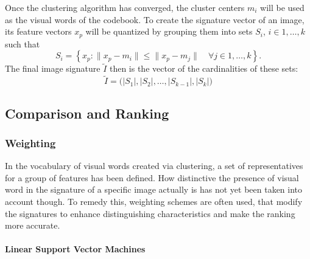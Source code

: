 Once the clustering algorithm has converged, the cluster centers $m_i$ will be
used as the visual words of the codebook. To create the signature vector of an
image, its feature vectors $x_p$ will be quantized by grouping them into sets
$S_i$, $i \in 1, \dots, k$ such that
\begin{equation*}
    S_i = \left\{ x_p : \| x_p - m_{i} \| \leq \| x_p - m_{j} \| \quad \forall j \in 1, \dots, k \right\}.
\end{equation*}
The final image signature $\tilde{I}$ then is the vector of the cardinalities
of these sets:
\begin{equation*}
    \tilde{I} = \big( |S_1|, |S_2|, \dots, |S_{k-1}|, |S_{k}| \big)
\end{equation*}

\subsection{Comparison and Ranking}\label{sec:anatomy_ranking}

\subsubsection{Weighting}\label{sec:anatomy_ranking_weighting}

In the vocabulary of visual words created via clustering, a set of
representatives for a group of features has been defined. How distinctive the
presence of visual word in the signature of a specific image actually is has
not yet been taken into account though. To remedy this, weighting schemes are
often used, that modify the signatures to enhance distinguishing characteristics
and make the ranking more accurate.

\paragraph{Linear Support Vector Machines}

